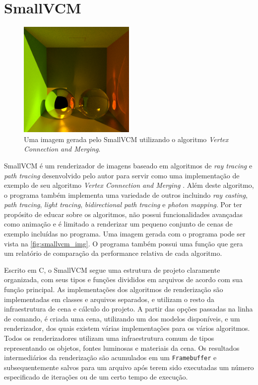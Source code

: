 \documentclass[tg]{mdtufsm}
\def\Cpp{{C\nolinebreak[4]\raisebox{.20ex}{\small\bf++}}}
\begin{document}
\section{SmallVCM}

\begin{figure}
	\centering
	\includegraphics[width=0.5\textwidth]{ggbs_s_vcm}
	\caption[Uma imagem gerada pelo SmallVCM.]{
		Uma imagem gerada pelo SmallVCM utilizando o algoritmo \emph{Vertex Connection and Merging}.
	}
	\label{fig:smallvcm_img}
\end{figure}

SmallVCM \citep{smallvcm} é um renderizador de imagens baseado em algoritmos de \emph{ray tracing} e \emph{path tracing} desenvolvido pelo autor para servir como uma implementação de exemplo de seu algoritmo \emph{Vertex Connection and Merging} \citep{georgiev2012}. Além deste algoritmo, o programa também implementa uma variedade de outros incluindo \emph{ray casting}, \emph{path tracing}, \emph{light tracing}, \emph{bidirectional path tracing} e \emph{photon mapping}. Por ter propósito de educar sobre os algoritmos, não possui funcionalidades avançadas como animação e é limitado a renderizar um pequeno conjunto de cenas de exemplo incluídas no programa. Uma imagem gerada com o programa pode ser vista na \autoref{fig:smallvcm_img}. O programa também possui uma função que gera um relatório de comparação da performance relativa de cada algoritmo.

Escrito em \Cpp, o SmallVCM segue uma estrutura de projeto claramente organizada, com seus tipos e funções divididos em arquivos de acordo com sua função principal. As implementações dos algoritmos de renderização são implementadas em classes e arquivos separados, e utilizam o resto da infraestrutura de cena e cálculo do projeto. A partir das opções passadas na linha de comando, é criada uma cena, utilizando um dos modelos disponíveis, e um renderizador, dos quais existem várias implementações para os vários algoritmos. Todos os renderizadores utilizam uma infraestrutura comum de tipos representando os objetos, fontes luminosas e materiais da cena. Os resultados intermediários da renderização são acumulados em um \texttt{Framebuffer} e subsequentemente salvos para um arquivo após terem sido executadas um número especificado de iterações ou de um certo tempo de execução.
\end{document}
